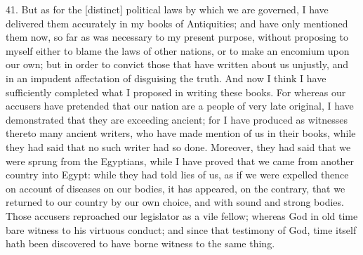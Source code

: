 41. But as for the [distinct] political laws by which we are governed, I
have delivered them accurately in my books of Antiquities; and have only
mentioned them now, so far as was necessary to my present purpose, without
proposing to myself either to blame the laws of other nations, or to make
an encomium upon our own; but in order to convict those that have written
about us unjustly, and in an impudent affectation of disguising the truth.
And now I think I have sufficiently completed what I proposed in writing
these books. For whereas our accusers have pretended that our nation are a
people of very late original, I have demonstrated that they are exceeding
ancient; for I have produced as witnesses thereto many ancient writers,
who have made mention of us in their books, while they had said that no
such writer had so done. Moreover, they had said that we were sprung from
the Egyptians, while I have proved that we came from another country into
Egypt: while they had told lies of us, as if we were expelled thence on
account of diseases on our bodies, it has appeared, on the contrary, that
we returned to our country by our own choice, and with sound and strong
bodies. Those accusers reproached our legislator as a vile fellow; whereas
God in old time bare witness to his virtuous conduct; and since that
testimony of God, time itself hath been discovered to have borne witness
to the same thing.


